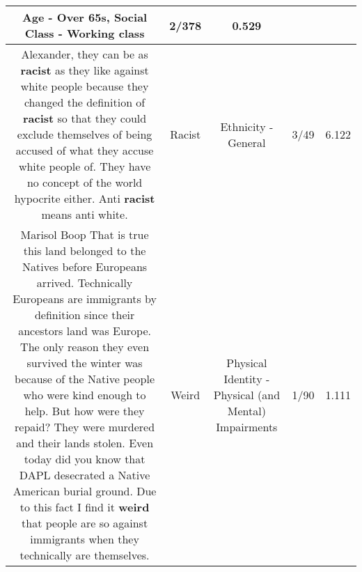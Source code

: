 \documentclass[11pt]{article}
\newlength\mylength
\begin{document}
\begin{center}
\begin{longtable}{|C{.65\mylength}|C{.30\mylength}|C{.12\mylength}|C{.12\mylength}|C{.12\mylength}|}
Age - Over 65s, Social Class - Working class & 2/378 & 0.529 \\  \hline
  \small Alexander, they can be as \textbf{racist} as they like against white people because they changed the definition of \textbf{racist} so that they could exclude themselves of being accused of what they accuse white people of. They have no concept of the world hypocrite either. Anti \textbf{racist} means anti white.\normalsize   & Racist & Ethnicity - General & 3/49 & 6.122 \\  \hline
  \small Marisol Boop That is true this land belonged to the Natives before Europeans arrived. Technically Europeans are immigrants by definition since their ancestors land was Europe. The only reason they even survived the winter was because of the Native people who were kind enough to help. But how were they repaid? They were murdered and their lands stolen. Even today did you know that DAPL desecrated a Native American burial ground. Due to this fact I find it \textbf{weird} that people are so against immigrants when they technically are themselves.\normalsize   & Weird & Physical Identity - Physical (and Mental) Impairments & 1/90 & 1.111 \\  \hline

\end{longtable}
\end{center}
\end{document}
